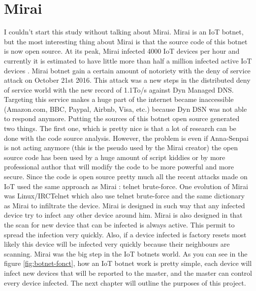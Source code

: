 \documentclass{report}
\begin{document}
\section{Mirai}
I couldn't start this study without talking about Mirai. Mirai is an IoT botnet, but the most interesting thing about Mirai is that the source code of this botnet is now open source. At its peak, Mirai infected 4000 IoT devices
per hour and currently it is estimated to have little more than half a million infected active IoT devices \autocite{angrishi2017turning}. Mirai botnet gain a certain amount of notoriety with the deny of service attack on October 21st 2016. This attack was a new steps in the distributed deny of service world with the new record of 1.1To/s against Dyn Managed DNS. Targeting this service makes a huge part of the internet became inaccessible (Amazon.com, BBC, Paypal, Airbnb, Visa, etc.) because Dyn DSN was not able to respond anymore.\newline
Putting the sources of this botnet open source generated two things. The first one, which is pretty nice is that a lot of research can be done with the code source analysis. However, the problem is even if Anna-Senpai is not acting anymore (this is the pseudo used by the Mirai creator) the open source code has been used by a huge amount of script kiddies or by more professional author that will modify the code to be more powerful and more secure. Since the code is open source pretty much all the recent attacks made on IoT used the same approach as Mirai : telnet brute-force.
One evolution of Mirai was Linux/IRCTelnet which also use telnet brute-force and the same dictionary as Mirai to infiltrate the device.\newline
\newline
Mirai is designed in such way that any infected device try to infect any other device around him. Mirai is also designed in that the scan for new device that can be infected is always active. This permit to spread the infection very quickly. Also, if a device infected is factory resets most likely this device will be infected very quickly because their neighbours are scanning. Mirai was the big step in the IoT botnets world.\newline
\newline
As you can see in the figure \ref{fig:botnet-fonct}, how an IoT botnet work is pretty simple, each device will infect new devices that will be reported to the master, and the master can control every device infected.\newline
The next chapter will outline the purposes of this project.
\end{document}
